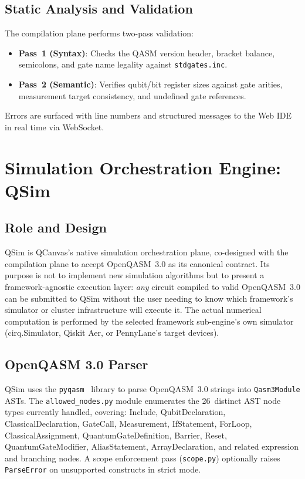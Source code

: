 \documentclass[runningheads]{llncs}
\begin{document}
\subsection{Static Analysis and Validation}

The compilation plane performs two-pass validation:
\begin{itemize}
    \item \textbf{Pass~1 (Syntax)}: Checks the QASM version header, bracket balance, semicolons, and gate name legality against \texttt{stdgates.inc}.
    \item \textbf{Pass~2 (Semantic)}: Verifies qubit/bit register sizes against gate arities, measurement target consistency, and undefined gate references.
\end{itemize}
Errors are surfaced with line numbers and structured messages to the Web IDE in real time via WebSocket.


\section{Simulation Orchestration Engine: QSim}

\subsection{Role and Design}

QSim is QCanvas's native simulation orchestration plane, co-designed with the compilation plane to accept OpenQASM~3.0 as its canonical contract. Its purpose is not to implement new simulation algorithms but to present a framework-agnostic execution layer: \emph{any} circuit compiled to valid OpenQASM~3.0 can be submitted to QSim without the user needing to know which framework's simulator or cluster infrastructure will execute it. The actual numerical computation is performed by the selected framework sub-engine's own simulator (cirq.Simulator, Qiskit Aer, or PennyLane's target devices).

\subsection{OpenQASM 3.0 Parser}

QSim uses the \texttt{pyqasm}~\cite{pyqasm} library to parse OpenQASM~3.0 strings into \texttt{Qasm3Module} ASTs. The \texttt{allowed\_nodes.py} module enumerates the 26~distinct AST node types currently handled, covering: Include, QubitDeclaration, ClassicalDeclaration, GateCall, Measurement, IfStatement, ForLoop, ClassicalAssignment, QuantumGateDefinition, Barrier, Reset, QuantumGateModifier, AliasStatement, ArrayDeclaration, and related expression and branching nodes. A scope enforcement pass (\texttt{scope.py}) optionally raises \texttt{ParseError} on unsupported constructs in strict mode.
\end{document}
